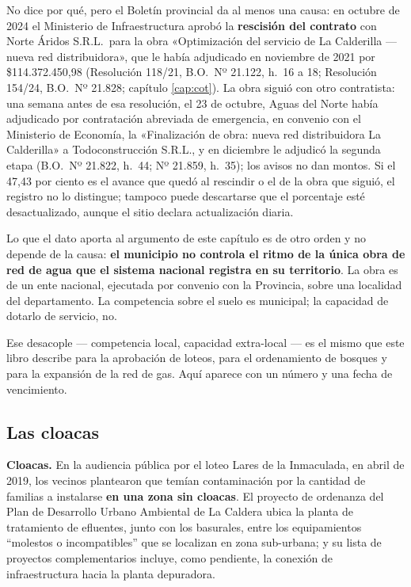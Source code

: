 No dice por qué, pero el Boletín provincial da al menos una causa: en octubre de 2024 el Ministerio de Infraestructura aprobó la \textbf{rescisión del contrato} con Norte Áridos S.R.L.\ para la obra «Optimización del servicio de La Calderilla --- nueva red distribuidora», que le había adjudicado en noviembre de 2021 por \$114.372.450,98 (Resolución 118/21, B.O.\ Nº 21.122, h.\ 16 a 18; Resolución 154/24, B.O.\ Nº 21.828; capítulo \ref{cap:cot}). La obra siguió con otro contratista: una semana antes de esa resolución, el 23 de octubre, Aguas del Norte había adjudicado por contratación abreviada de emergencia, en convenio con el Ministerio de Economía, la «Finalización de obra: nueva red distribuidora La Calderilla» a Todoconstrucción S.R.L., y en diciembre le adjudicó la segunda etapa (B.O.\ Nº 21.822, h.\ 44; Nº 21.859, h.\ 35); los avisos no dan montos. Si el 47,43 por ciento es el avance que quedó al rescindir o el de la obra que siguió, el registro no lo distingue; tampoco puede descartarse que el porcentaje esté desactualizado, aunque el sitio declara actualización diaria.

Lo que el dato aporta al argumento de este capítulo es de otro orden y no depende de la causa: \textbf{el municipio no controla el ritmo de la única obra de red de agua que el sistema nacional registra en su territorio}. La obra es de un ente nacional, ejecutada por convenio con la Provincia, sobre una localidad del departamento. La competencia sobre el suelo es municipal; la capacidad de dotarlo de servicio, no.

Ese desacople --- competencia local, capacidad extra-local --- es el mismo que este libro describe para la aprobación de loteos, para el ordenamiento de bosques y para la expansión de la red de gas. Aquí aparece con un número y una fecha de vencimiento.

\subsection*{Las cloacas}

\textbf{Cloacas.} En la audiencia pública por el loteo Lares de la Inmaculada, en abril de 2019, los vecinos plantearon que temían contaminación por la cantidad de familias a instalarse \textbf{en una zona sin cloacas}. El proyecto de ordenanza del Plan de Desarrollo Urbano Ambiental de La Caldera ubica la planta de tratamiento de efluentes, junto con los basurales, entre los equipamientos ``molestos o incompatibles'' que se localizan en zona sub-urbana; y su lista de proyectos complementarios incluye, como pendiente, la conexión de infraestructura hacia la planta depuradora.

